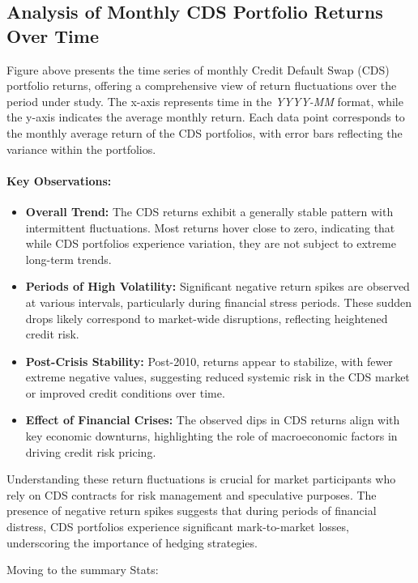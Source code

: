 \documentclass{article}
\begin{document}
\subsection{Analysis of Monthly CDS Portfolio Returns Over Time}

Figure above presents the time series of monthly Credit Default Swap (CDS) portfolio returns, offering a comprehensive view of return fluctuations over the period under study. The x-axis represents time in the \textit{YYYY-MM} format, while the y-axis indicates the average monthly return. Each data point corresponds to the monthly average return of the CDS portfolios, with error bars reflecting the variance within the portfolios.

\paragraph{Key Observations:}
\begin{itemize}
    \item \textbf{Overall Trend:} The CDS returns exhibit a generally stable pattern with intermittent fluctuations. Most returns hover close to zero, indicating that while CDS portfolios experience variation, they are not subject to extreme long-term trends.
    \item \textbf{Periods of High Volatility:} Significant negative return spikes are observed at various intervals, particularly during financial stress periods. These sudden drops likely correspond to market-wide disruptions, reflecting heightened credit risk.
    \item \textbf{Post-Crisis Stability:} Post-2010, returns appear to stabilize, with fewer extreme negative values, suggesting reduced systemic risk in the CDS market or improved credit conditions over time.
    \item \textbf{Effect of Financial Crises:} The observed dips in CDS returns align with key economic downturns, highlighting the role of macroeconomic factors in driving credit risk pricing.
\end{itemize}

Understanding these return fluctuations is crucial for market participants who rely on CDS contracts for risk management and speculative purposes. The presence of negative return spikes suggests that during periods of financial distress, CDS portfolios experience significant mark-to-market losses, underscoring the importance of hedging strategies.

Moving to the summary Stats: \\
\end{document}
